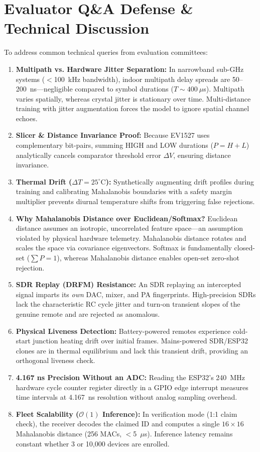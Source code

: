 \documentclass[11pt,a4paper]{article}
\begin{document}
\section{Evaluator Q\&A Defense \& Technical Discussion}
To address common technical queries from evaluation committees:
\begin{enumerate}\setlength\itemsep{0.2em}
    \item \textbf{Multipath vs. Hardware Jitter Separation:} In narrowband sub-GHz systems ($<$100~kHz bandwidth), indoor multipath delay spreads are 50--200~ns—negligible compared to symbol durations ($T \sim 400\ \mu$s). Multipath varies spatially, whereas crystal jitter is stationary over time. Multi-distance training with jitter augmentation forces the model to ignore spatial channel echoes.
    \item \textbf{Slicer \& Distance Invariance Proof:} Because EV1527 uses complementary bit-pairs, summing HIGH and LOW durations ($P = H + L$) analytically cancels comparator threshold error $\Delta V$, ensuring distance invariance.
    \item \textbf{Thermal Drift ($\Delta T = 25^\circ\text{C}$):} Synthetically augmenting drift profiles during training and calibrating Mahalanobis boundaries with a safety margin multiplier prevents diurnal temperature shifts from triggering false rejections.
    \item \textbf{Why Mahalanobis Distance over Euclidean/Softmax?} Euclidean distance assumes an isotropic, uncorrelated feature space—an assumption violated by physical hardware telemetry. Mahalanobis distance rotates and scales the space via covariance eigenvectors. Softmax is fundamentally closed-set ($\sum P = 1$), whereas Mahalanobis distance enables open-set zero-shot rejection.
    \item \textbf{SDR Replay (DRFM) Resistance:} An SDR replaying an intercepted signal imparts its \textit{own} DAC, mixer, and PA fingerprints. High-precision SDRs lack the characteristic RC cycle jitter and turn-on transient slopes of the genuine remote and are rejected as anomalous.
    \item \textbf{Physical Liveness Detection:} Battery-powered remotes experience cold-start junction heating drift over initial frames. Mains-powered SDR/ESP32 clones are in thermal equilibrium and lack this transient drift, providing an orthogonal liveness check.
    \item \textbf{4.167 ns Precision Without an ADC:} Reading the ESP32's 240~MHz hardware cycle counter register directly in a GPIO edge interrupt measures time intervals at 4.167~ns resolution without analog sampling overhead.
    \item \textbf{Fleet Scalability ($\mathcal{O}(1)$ Inference):} In verification mode (1:1 claim check), the receiver decodes the claimed ID and computes a single $16 \times 16$ Mahalanobis distance (256 MACs, $<$5~$\mu$s). Inference latency remains constant whether 3 or 10,000 devices are enrolled.
\end{enumerate}
\end{document}
